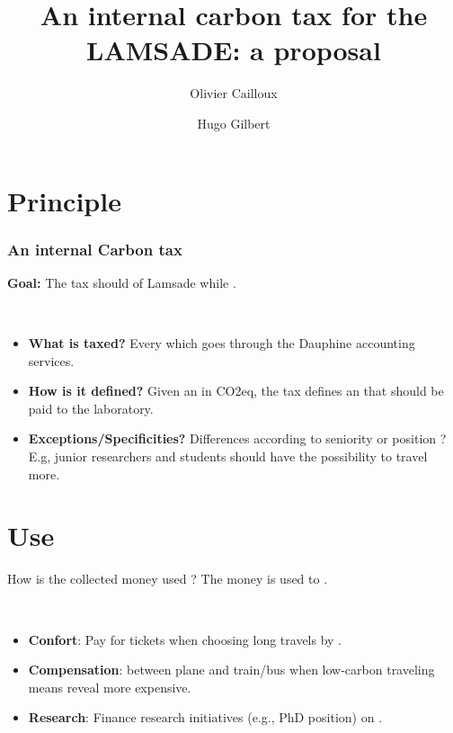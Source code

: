 \documentclass[french, english]{beamer}
\title[Proposal for a tax]{An internal carbon tax for the LAMSADE: a proposal}
\author{Olivier Cailloux \and Hugo Gilbert}
\institute[LAMSADE]{LAMSADE, Université Paris-Dauphine, PSL}
\date{\formatdate{11}{10}{2022}}
\begin{document}
\begin{frame}[plain]
	\titlepage
\end{frame}
\addtocounter{framenumber}{-1}

\section{Principle}





\frame
{
  \frametitle{An internal Carbon tax}

\textbf{Goal:} The tax should  of Lamsade while . 

\

  \begin{itemize}
  \item \textbf{What is taxed?} Every  which goes through the Dauphine accounting services.
  \item \textbf{How is it defined?} Given an  in CO2eq, the tax defines an  that should be paid to the laboratory.
  \item \textbf{Exceptions/Specificities?} Differences according to seniority or position ? E.g, junior researchers and students should have the possibility to travel more.
  \end{itemize}
}

\section{Use}
\begin{frame}{How is the collected money used ?}
The money is used to .

\

\begin{itemize} 
    \item \textbf{Confort}: Pay for  tickets when choosing long travels by . 
    \item \textbf{Compensation}:  between plane and train/bus when low-carbon traveling means reveal more expensive.  
    \item \textbf{Research}: Finance research initiatives (e.g., PhD position) on .
\end{itemize}	
\end{frame}
\end{document}
